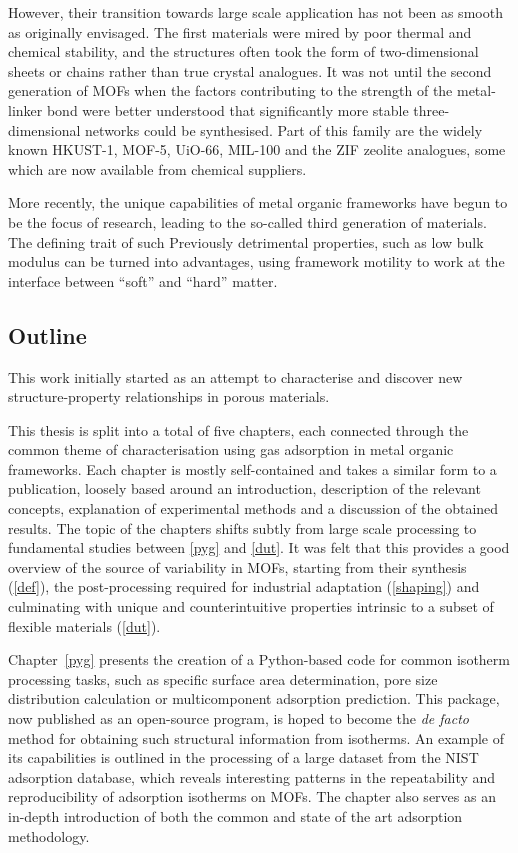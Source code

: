 However, their transition towards large scale application has not been
as smooth as originally envisaged. The first materials
were mired by poor thermal and chemical stability, and the structures 
often took the form of two-dimensional sheets or chains rather than
true crystal analogues. It was not until the second generation of MOFs 
when the factors contributing to the strength of the metal-linker
bond were better understood that significantly more stable 
three-dimensional networks could be synthesised.
Part of this family are the widely known HKUST-1, MOF-5, UiO-66, MIL-100
and the ZIF zeolite analogues, some which are now available from chemical
suppliers.

More recently, the unique capabilities of metal organic frameworks
have begun to be the focus of research, leading to the so-called third 
generation of materials. The defining trait of such 
Previously detrimental properties, such as low bulk modulus
can be turned into advantages, using framework motility to 
work at the interface between ``soft'' and ``hard'' matter.

\subsection*{Outline}

This work initially started as an attempt to characterise and discover 
new structure-property relationships in porous materials. 

This thesis is split into a total of five chapters, each
connected through the common theme of characterisation 
using gas adsorption in metal organic frameworks. 
Each chapter is mostly 
self-contained and takes a similar form to a publication,
loosely based around an introduction, description of the 
relevant concepts, explanation of experimental methods and
a discussion of the obtained results. The topic of the chapters 
shifts subtly from large scale processing to fundamental
studies between \autoref{pyg} and \autoref{dut}. It was felt 
that this provides a good overview of the source of 
variability in MOFs, starting from their synthesis
(\autoref{def}), the post-processing required for industrial
adaptation (\autoref{shaping}) and culminating with 
unique and counterintuitive properties intrinsic to a subset 
of flexible materials (\autoref{dut}).

Chapter~\ref{pyg} presents the creation of a Python-based code for
common isotherm processing tasks, such as specific surface area 
determination, pore size distribution calculation or multicomponent 
adsorption prediction. This package, now published as an 
open-source program, is hoped to become the \textit{de facto}
method for obtaining such structural information from isotherms. 
An example of its capabilities is outlined in the processing of 
a large dataset from the NIST adsorption database, which reveals 
interesting patterns in the repeatability and reproducibility of 
adsorption isotherms on MOFs. The chapter also serves as an in-depth
introduction of both the common and state of the art adsorption methodology.

